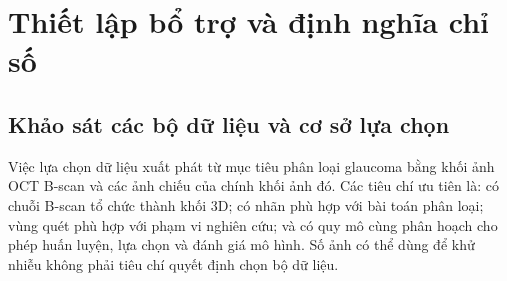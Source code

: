\chapter{Thiết lập bổ trợ và định nghĩa chỉ số}
\label{app:supporting-methods}

\section{Khảo sát các bộ dữ liệu và cơ sở lựa chọn}
\label{sec:dataset-selection}
Việc lựa chọn dữ liệu xuất phát từ mục tiêu phân loại glaucoma
bằng khối ảnh OCT B-scan và các ảnh chiếu của chính khối
ảnh đó. Các tiêu chí ưu tiên là: có chuỗi B-scan tổ chức thành khối
3D; có nhãn phù hợp với bài toán phân loại; vùng quét phù hợp với
phạm vi nghiên cứu; và có quy mô cùng phân hoạch cho phép huấn luyện,
lựa chọn và đánh giá mô hình. Số ảnh có thể dùng để khử nhiễu không
phải tiêu chí quyết định chọn bộ dữ liệu.

